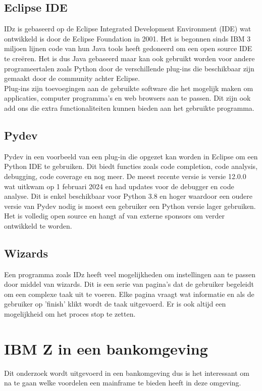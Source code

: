 \subsection{Eclipse IDE}
IDz is gebaseerd op de Eclipse Integrated Development Environment (IDE) wat ontwikkeld is door de Eclipse Foundation in 2001. Het is begonnen sinds IBM 3 miljoen lijnen code van hun Java tools heeft gedoneerd om een open source IDE te creëren. Het is dus Java gebaseerd maar kan ook gebruikt worden voor andere programeertalen zoals Python door de verschillende plug-ins die beschikbaar zijn gemaakt door de community achter Eclipse. \autocite{Hanna2021} \\

Plug-ins zijn toevoegingen aan de gebruikte software die het mogelijk maken om applicaties, computer programma's en web browsers aan te passen. Dit zijn ook add ons die extra functionaliteiten kunnen bieden aan het gebruikte programma. \autocite{George2021} 

\subsection{Pydev}
Pydev in een voorbeeld van een plug-in die opgezet kan worden in Eclipse om een Python IDE te gebruiken.  Dit biedt functies zoals code completion, code analysis, debugging, code coverage en nog meer. De meest recente versie is versie 12.0.0 wat uitkwam op 1 februari 2024 en had updates voor de debugger en code analyse. Dit is enkel beschikbaar voor Python 3.8 en hoger waardoor een oudere versie van Pydev nodig is moest een gebruiker een Python versie lager gebruiken. Het is volledig open source en hangt af van externe sponsors om verder ontwikkeld te worden. \autocite{Pydev2024}

\subsection{Wizards}
Een programma zoals IDz heeft veel mogelijkheden om instellingen aan te passen door middel van wizards. Dit is een serie van pagina's dat de gebruiker begeleidt om een complexe taak uit te voeren. Elke pagina vraagt wat informatie en als de gebruiker op 'finish' klikt wordt de taak uitgevoerd. Er is ook altijd een mogelijkheid om het proces stop te zetten. \autocite{Eclipse2006}

\section{IBM Z in een bankomgeving}
Dit onderzoek wordt uitgevoerd in een bankomgeving dus is het interessant om na te gaan welke voordelen een mainframe te bieden heeft in deze omgeving. \\ 


